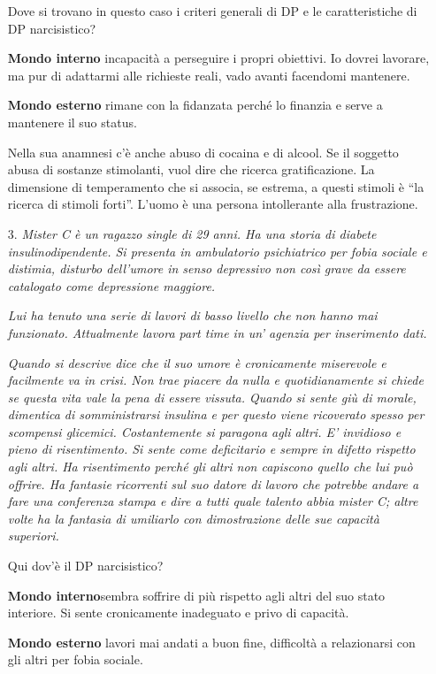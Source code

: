 \begin{itemize}
Dove si trovano in questo caso i criteri generali di DP e le
caratteristiche di DP narcisistico?

\textbf{Mondo interno} incapacità a perseguire i propri obiettivi. Io
dovrei lavorare, ma pur di adattarmi alle richieste reali, vado avanti
facendomi mantenere.

\textbf{Mondo esterno} rimane con la fidanzata perché lo finanzia e
serve a mantenere il suo status.

Nella sua anamnesi c'è anche abuso di cocaina e di alcool. Se il
soggetto abusa di sostanze stimolanti, vuol dire che ricerca
gratificazione. La dimensione di temperamento che si associa, se
estrema, a questi stimoli è ``la ricerca di stimoli forti''. L'uomo è
una persona intollerante alla frustrazione.

\item[3.]
  \emph{Mister C è un ragazzo single di 29 anni. Ha una storia di
  diabete insulinodipendente. Si presenta in ambulatorio psichiatrico
  per fobia sociale e distimia, disturbo dell'umore in senso depressivo
  non così grave da essere catalogato come depressione maggiore. }

\emph{Lui ha tenuto una serie di lavori di basso livello che non hanno
mai funzionato. Attualmente lavora part time in un' agenzia per
inserimento dati. }

\emph{Quando si descrive dice che il suo umore è cronicamente miserevole
e facilmente va in crisi. Non trae piacere da nulla e quotidianamente si
chiede se questa vita vale la pena di essere vissuta. Quando si sente
giù di morale, dimentica di somministrarsi insulina e per questo viene
ricoverato spesso per scompensi glicemici. Costantemente si paragona
agli altri. E' invidioso e pieno di risentimento. Si sente come
deficitario e sempre in difetto rispetto agli altri. Ha risentimento
perché gli altri non capiscono quello che lui può offrire. Ha fantasie
ricorrenti sul suo datore di lavoro che potrebbe andare a fare una
conferenza stampa e dire a tutti quale talento abbia mister C; altre
volte ha la fantasia di umiliarlo con dimostrazione delle sue capacità
superiori.}

Qui dov'è il DP narcisistico?

\textbf{Mondo interno}sembra soffrire di più rispetto agli altri del suo
stato interiore. Si sente cronicamente inadeguato e privo di capacità.

\textbf{Mondo esterno} lavori mai andati a buon fine, difficoltà a
relazionarsi con gli altri per fobia sociale.


\end{itemize}
